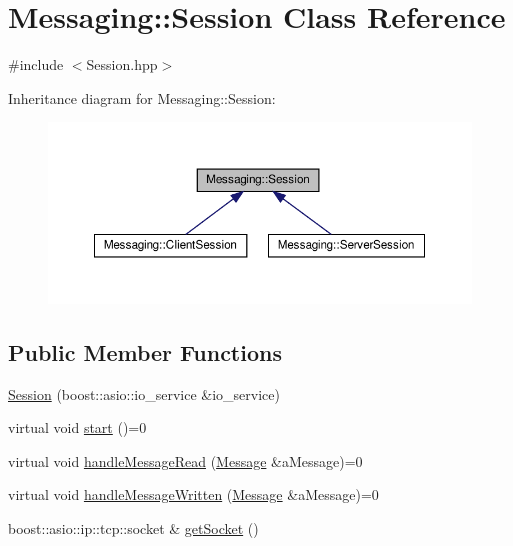 \hypertarget{class_messaging_1_1_session}{}\section{Messaging\+:\+:Session Class Reference}
\label{class_messaging_1_1_session}


{\ttfamily \#include $<$Session.\+hpp$>$}



Inheritance diagram for Messaging\+:\+:Session\+:
\nopagebreak
\begin{figure}[H]
\begin{center}
\leavevmode
\includegraphics[width=350pt]{class_messaging_1_1_session__inherit__graph}
\end{center}
\end{figure}
\subsection*{Public Member Functions}
\begin{DoxyCompactItemize}
\item 
\hyperlink{class_messaging_1_1_session_ab2e5e804ffa5711fbc7007f07180a0df}{Session} (boost\+::asio\+::io\+\_\+service \&io\+\_\+service)
\item 
virtual void \hyperlink{class_messaging_1_1_session_a89cbd6e05fdbbe1c9e26cbcab92d6044}{start} ()=0
\item 
virtual void \hyperlink{class_messaging_1_1_session_ac2fbf589586288cee9b408514907d044}{handle\+Message\+Read} (\hyperlink{struct_messaging_1_1_message}{Message} \&a\+Message)=0
\item 
virtual void \hyperlink{class_messaging_1_1_session_afcf204df8f7e67e470d454d9de561515}{handle\+Message\+Written} (\hyperlink{struct_messaging_1_1_message}{Message} \&a\+Message)=0
\item 
boost\+::asio\+::ip\+::tcp\+::socket \& \hyperlink{class_messaging_1_1_session_aedafb8b5c664cd9d2d86b90b863bde77}{get\+Socket} ()
\end{DoxyCompactItemize}
